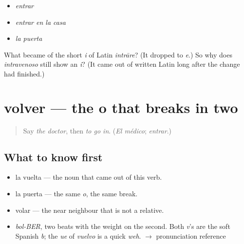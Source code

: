\begin{itemize}
\raggedright
  \item \emph{entrar}
  \item \emph{entrar en la casa}
  \item \emph{la puerta}
\end{itemize}

\begin{tcolorbox}[breakable,colback=teal!4,colframe=teal!35!black,title={Before you move on}]
What became of the short \emph{i} of Latin \emph{intrāre}? (It dropped to \emph{e}.) So why does \emph{intravenoso} still show an \emph{i}? (It came out of written Latin long after the change had finished.)
\end{tcolorbox}
\section[volver]{volver — the o that breaks in two}

\label{lesson:ES-C395-volver}



\begin{quote}
Say \emph{the doctor}, then \emph{to go in}. (\emph{El médico}; \emph{entrar}.)
\end{quote}

\subsection*{What to know first}
\begin{itemize}
\raggedright
  \item la vuelta — the noun that came out of this verb.
  \item la puerta — the same \emph{o}, the same break.
  \item volar — the near neighbour that is not a relative.
\end{itemize}

\begin{sounds}
\begin{itemize}
\raggedright
  \item \emph{bol-BER}, two beats with the weight on the second. Both \emph{v}'s are the soft Spanish \emph{b}; the \emph{ue} of \emph{vuelvo} is a quick \emph{weh}. $\to$ pronunciation reference
\end{itemize}
\end{sounds}

